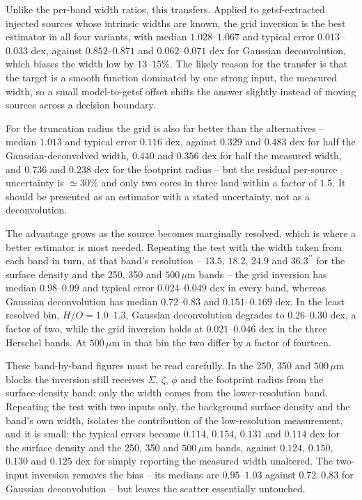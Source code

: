 \documentclass[11pt,a4paper]{article}
\begin{document}
Unlike the per-band width ratios, this transfers. Applied to getsf-extracted
injected sources whose intrinsic widths are known, the grid inversion is the
best estimator in all four variants, with median $1.028$--$1.067$ and typical
error $0.013$--$0.033$ dex, against $0.852$--$0.871$ and $0.062$--$0.071$ dex
for Gaussian deconvolution, which biases the width low by $13$--$15$\%. The
likely reason for the transfer is that the target is a smooth function
dominated by one strong input, the measured width, so a small model-to-getsf
offset shifts the answer slightly instead of moving sources across a decision
boundary.

For the truncation radius the grid is also far better than the alternatives --
median $1.013$ and typical error $0.116$ dex, against $0.329$ and $0.483$ dex
for half the Gaussian-deconvolved width, $0.440$ and $0.356$ dex for half the
measured width, and $0.736$ and $0.238$ dex for the footprint radius -- but the
residual per-source uncertainty is $\simeq30$\% and only two cores in three
land within a factor of $1.5$. It should be presented as an estimator with a
stated uncertainty, not as a deconvolution.

The advantage grows as the source becomes marginally resolved, which is where a
better estimator is most needed. Repeating the test with the width taken from
each band in turn, at that band's resolution -- $13.5$, $18.2$, $24.9$ and
$36.3^{\prime\prime}$ for the surface density and the 250, 350 and $500\,\mu$m bands --
the grid inversion has median $0.98$--$0.99$ and typical error $0.024$--$0.049$
dex in every band, whereas Gaussian deconvolution has median $0.72$--$0.83$ and
$0.151$--$0.169$ dex. In the least resolved bin, $H/O = 1.0$--$1.3$, Gaussian
deconvolution degrades to $0.26$--$0.30$ dex, a factor of two, while the grid
inversion holds at $0.021$--$0.046$ dex in the three Herschel bands. At
$500\,\mu$m in that bin the two differ by a factor of fourteen.

These band-by-band figures must be read carefully. In the 250, 350 and
$500\,\mu$m blocks the inversion still receives $\Sigma$, $\zeta$, $\phi$ and
the footprint radius from the surface-density band; only the width comes from
the lower-resolution band. Repeating the test with two inputs only, the
background surface density and the band's own width, isolates the contribution
of the low-resolution measurement, and it is small: the typical errors become
$0.114$, $0.154$, $0.131$ and $0.114$ dex for the surface density and the 250,
350 and $500\,\mu$m bands, against $0.124$, $0.150$, $0.130$ and $0.125$ dex
for simply reporting the measured width unaltered. The two-input inversion
removes the bias -- its medians are $0.95$--$1.03$ against $0.72$--$0.83$ for
Gaussian deconvolution -- but leaves the scatter essentially untouched.
\end{document}
